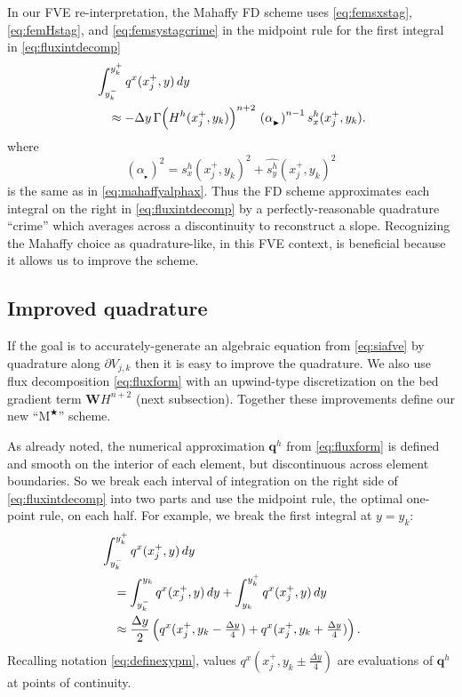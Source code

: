 \documentclass[review,letterpaper]{igs}
\newcommand\bq{\mathbf{q}}
\newcommand\bW{\mathbf{W}}
\newcommand{\Mstar}{$\text{M}^{\bigstar}$\xspace}
\newcommand\alpharight{\alpha_{{}_{\blacktriangleright}}}
\begin{document}
In our FVE re-interpretation, the Mahaffy FD scheme uses \eqref{eq:femsxstag}, \eqref{eq:femHstag}, and \eqref{eq:femsystagcrime} in the midpoint rule for the first integral in \eqref{eq:fluxintdecomp}
\begin{align}
&\int_{y_k^-}^{y_k^+} q^x(x_j^+,y)\,dy  \label{eq:femmahaffyfirstint} \\
  &\quad\approx - \Delta y\, \Gamma \Big(H^h(x_j^+,y_k)\Big)^{n+2} \,\left(\alpharight\right)^{n-1} s^h_x(x_j^+,y_k). \notag 
\end{align}
where
\begin{equation}
\left(\alpharight\right)^2 = s^h_x(x_j^+,y_k)^2 + \widehat{s^h_y}(x_j^+,y_k)^2
\end{equation}
is the same as in \eqref{eq:mahaffyalphax}.  Thus the FD scheme approximates each integral on the right in \eqref{eq:fluxintdecomp} by a perfectly-reasonable quadrature ``crime'' \citep[compare][]{Strang1972} which averages across a discontinuity to reconstruct a slope.  Recognizing the Mahaffy choice as quadrature-like, in this FVE context, is beneficial because it allows us to improve the scheme.


\subsection{Improved quadrature}

If the goal is to accurately-generate an algebraic equation from \eqref{eq:siafve} by quadrature along $\partial V_{j,k}$ then it is easy to improve the quadrature.  We also use flux decomposition \eqref{eq:fluxform} with an upwind-type discretization on the bed gradient term $\bW H^{n+2}$ (next subsection).  Together these improvements define our new ``\Mstar'' scheme.

As already noted, the numerical approximation $\bq^h$ from \eqref{eq:fluxform} is defined and smooth on the interior of each element, but discontinuous across element boundaries.  So we break each interval of integration on the right side of \eqref{eq:fluxintdecomp} into two parts and use the midpoint rule, the optimal one-point rule, on each half.  For example, we break the first integral at $y=y_k$:
\begin{align}
&\int_{y_k^-}^{y_k^+} q^x(x_j^+,y)\,dy  \label{eq:starbreakfirst} \\
  &\quad= \int_{y_k^-}^{y_k} q^x(x_j^+,y)\,dy + \int_{y_k}^{y_k^+} q^x(x_j^+,y)\,dy \notag \\
  &\quad\approx \frac{\Delta y}{2} \left(q^x(x_j^+,y_k-\tfrac{\Delta y}{4}) + q^x(x_j^+,y_k+\tfrac{\Delta y}{4})\right). \notag
\end{align}
Recalling notation \eqref{eq:definexypm}, values $q^x(x_j^+,y_k\pm\tfrac{\Delta y}{4})$ are evaluations of $\bq^h$ at points of continuity.
\end{document}
